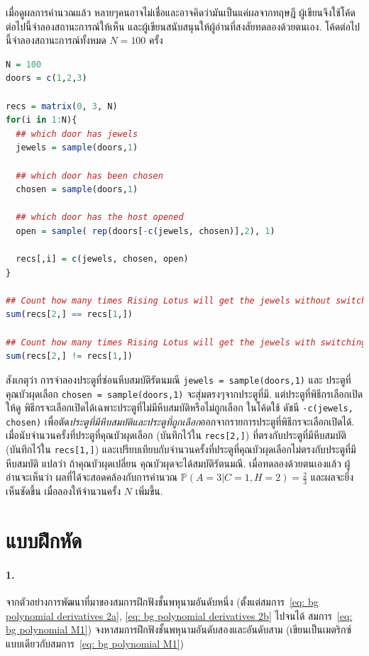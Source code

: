 เมื่อดูผลการคำนวณแล้ว หลายๆคนอาจไม่เชื่อและอาจคิดว่ามันเป็นแค่ผลจากทฤษฎี
ผู้เขียนจึงใช้โค้ดต่อไปนี้จำลองสถานะการณ์ให้เห็น
และผู้เขียนสนับสนุนให้ผู้อ่านที่สงสัยทดลองด้วยตนเอง.
%
โค้ดต่อไปนี้จำลองสถานะการณ์ทั้งหมด $N = 100$ ครั้ง
\begin{lstlisting}[language=R]
N = 100
doors = c(1,2,3)

recs = matrix(0, 3, N)
for(i in 1:N){
  ## which door has jewels
  jewels = sample(doors,1)

  ## which door has been chosen
  chosen = sample(doors,1)

  ## which door has the host opened
  open = sample( rep(doors[-c(jewels, chosen)],2), 1)

  recs[,i] = c(jewels, chosen, open)
}

## Count how many times Rising Lotus will get the jewels without switching
sum(recs[2,] == recs[1,])

## Count how many times Rising Lotus will get the jewels with switching
sum(recs[2,] != recs[1,])
\end{lstlisting}
สังเกตุว่า การจำลองประตูที่ซ่อนหีบสมบัติรัตนมณี \verb|jewels = sample(doors,1)| และ 
ประตูที่คุณบัวผุดเลือก \verb|chosen = sample(doors,1)| จะสุ่มตรงๆจากประตูที่มี.
แต่ประตูที่พิธีกรเลือกเปิดให้ดู พิธีกรจะเลือกเปิดได้เฉพาะประตูที่ไม่มีหีบสมบัติหรือไม่ถูกเลือก
ในโค้ดใช้ ดัชนี \verb|-c(jewels, chosen)| 
เพื่อตัด\textit{ประตูที่มีหีบสมบัติและประตูที่ถูกเลือก}ออกจากรายการประตูที่พิธีกรจะเลือกเปิดได้.
เมื่อนับจำนวนครั้งที่ประตูที่คุณบัวผุดเลือก (บันทึกไว้ใน \verb|recs[2,]|) ที่ตรงกับประตูที่มีหีบสมบัติ (บันทึกไว้ใน \verb|recs[1,]|) 
และเปรียบเทียบกับจำนวนครั้งที่ประตูที่คุณบัวผุดเลือกไม่ตรงกับประตูที่มีหีบสมบัติ แปลว่า ถ้าคุณบัวผุดเปลี่ยน คุณบัวผุดจะได้สมบัติรัตนมณี.
เมื่อทดลองด้วยตนเองแล้ว ผู้อ่านจะเห็นว่า ผลที่ได้จะสอดคล้องกับการคำนวณ $\mathbb{P}(A = 3|C = 1, H = 2) = \frac{2}{3}$ และผลจะยิ่งเห็นชัดขึ้น เมื่อลองให้จำนวนครั้ง $N$ เพิ่มขึ้น.

\section{แบบฝึกหัด}
\label{section: bg exercises}


\paragraph{1.} จากตัวอย่างการพัฒนาที่มาของสมการฝึกฟังชั้นพหุนามอันดับหนึ่ง (ตั้งแต่สมการ~\ref{eq: bg polynomial derivatives 2a},
\ref{eq: bg polynomial derivatives 2b} 
ไปจนได้ สมการ~\ref{eq: bg polynomial M1})
จงหาสมการฝึกฟังชั้นพหุนามอันดับสองและอันดับสาม (เขียนเป็นเมตริกซ์แบบเดียวกับสมการ~\ref{eq: bg polynomial M1})

